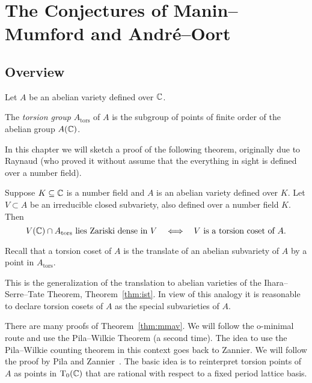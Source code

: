 \chapter{The Conjectures of Manin--Mumford and Andr\'e--Oort}

\section{Overview}

Let $A$ be an abelian variety defined over ${\mathbb{C}}$.

\begin{definition}
  The \emph{torsion group} $A_{\mathrm{tors}}$ of $A$ is the subgroup of points
  of finite order of the abelian group $A({\mathbb{C}})$.
\end{definition}

In this chapter we will sketch a proof of the following theorem,
originally due to Raynaud (who proved it without assume that the
everything in sight is defined over a number field).

\begin{theorem}
  \label{thm:mmav}
  Suppose $K\subseteq{\mathbb{C}}$ is a number field and $A$ is an abelian
  variety defined over $K$. 
  Let $V\subset A$ be an irreducible closed subvariety, also defined over a
  number field $K$. Then
  \begin{equation*}
    V({\mathbb{C}}) \cap A_{\mathrm{tors}} \text{ lies Zariski dense in
      $V$}\quad\Longleftrightarrow \quad
    \text{$V$ is a torsion coset of $A$.}
  \end{equation*}
\end{theorem}

Recall that a torsion coset of $A$ is the translate of an abelian
subvariety of $A$ by a point in $A_{\mathrm{tors}}$. 

This is the generalization of the translation to abelian varieties of
the Ihara--Serre--Tate Theorem, Theorem~\ref{thm:ist}. In view of this
analogy it is reasonable to declare torsion cosets of $A$ as the
special subvarieties of $A$.

There are many proofs of Theorem~\ref{thm:mmav}. We will follow the
o-minimal route and use the Pila--Wilkie Theorem (a second time). The
idea to use the Pila--Wilkie counting theorem in this context goes
back to Zannier. We will follow the proof by Pila and
Zannier~\cite{PilaZannier}. The basic idea is to reinterpret torsion
points of $A$ as points in $\mathrm{T}_0({\mathbb{C}})$ that are rational with
respect to a fixed period lattice basis.

